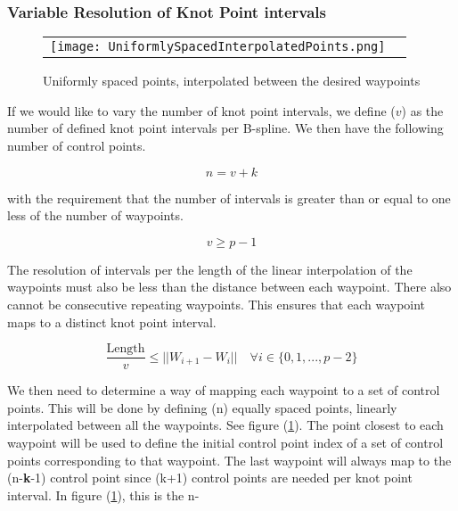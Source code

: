 \documentclass{article}
\begin{document}
\subsubsection{Variable Resolution of Knot Point intervals}

\begin{figure}[h]
\begin{tabular}{ll}
\texttt{[image: UniformlySpacedInterpolatedPoints.png]}
\end{tabular}
\caption{Uniformly spaced points, interpolated between the desired waypoints}
\label{Fig:UniformlySpacedInterpolatedPoints}
\end{figure}

If we would like to vary the number of knot point intervals, we define (\(v\)) as the number of defined knot point intervals per B-spline. We then have the following number of control points.

\begin{equation}
    n = v + k
\end{equation}

with the requirement that the number of intervals is greater than or equal to one less of the number of waypoints.

\begin{equation}
    v \geq p-1
\end{equation}

The resolution of intervals per the length of the linear interpolation of the waypoints must also be less than the distance between each waypoint. There also cannot be consecutive repeating waypoints. This ensures that each waypoint maps to a distinct knot point interval.

\begin{equation}
    \frac{\text{Length}}{v} \leq ||W_{i+1} - W_{i}|| \quad \forall i \in \{ {0 , 1 , ..., p-2} \}
\end{equation}

We then need to determine a way of mapping each waypoint to a set of control points. This will be done by defining (n) equally spaced points, linearly interpolated between all the waypoints. See figure (\ref{Fig:UniformlySpacedInterpolatedPoints}). The point closest to each waypoint will be used to define the initial control point index of a set of control points corresponding to that waypoint. The last waypoint will always map to the (n-\textbf{k}-1) control point since (k+1) control points are needed per knot point interval. In figure (\ref{Fig:UniformlySpacedInterpolatedPoints}), this is the n-
\end{document}
